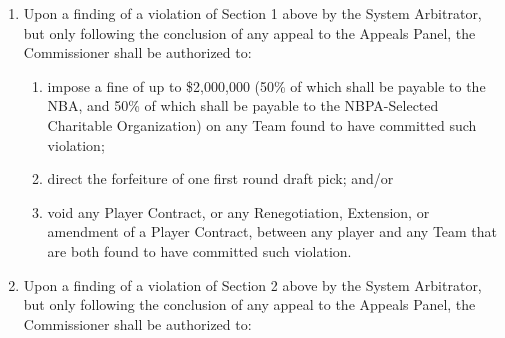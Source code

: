 \documentclass[
]{book}
\providecommand{\tightlist}{%
  \setlength{\itemsep}{0pt}\setlength{\parskip}{0pt}}
\begin{document}
\begin{enumerate}
\def\labelenumi{(\alph{enumi})}
\tightlist
\item
  Upon a finding of a violation of Section 1 above by the System Arbitrator, but only following the conclusion of any appeal to the Appeals Panel, the Commissioner shall be authorized to:

  \begin{enumerate}
  \def\labelenumii{(\roman{enumii})}
  \tightlist
  \item
    impose a fine of up to \$2,000,000 (50\% of which shall be payable to the NBA, and 50\% of which shall be payable to the NBPA-Selected Charitable Organization) on any Team found to have committed such violation;
  \item
    direct the forfeiture of one first round draft pick; and/or
  \item
    void any Player Contract, or any Renegotiation, Extension, or amendment of a Player Contract, between any player and any Team that are both found to have committed such violation.
  \end{enumerate}
\item
  Upon a finding of a violation of Section 2 above by the System Arbitrator, but only following the conclusion of any appeal to the Appeals Panel, the Commissioner shall be authorized to:


\end{enumerate}
\end{document}
